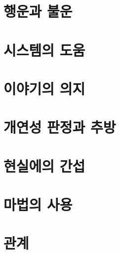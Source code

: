 \documentclass{report}
\begin{document}
	\section{행운과 불운}
		
	
	\section{시스템의 도움}
		
	
	\section{이야기의 의지}
		
	
	\section{개연성 판정과 추방}
		
	
	\section{현실에의 간섭}
		
	
	\section{마법의 사용}
		
	
	\section{관계}
		
\end{document}
